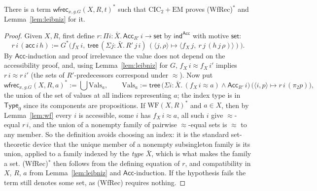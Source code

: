 \documentclass[10pt]{article}
\newcommand{\Type}{\mathsf{Type}}
\newcommand{\CIC}{\mathrm{CIC}}
\newcommand{\EM}{\mathrm{EM}}
\newcommand{\WF}{\mathrm{WF}}
\newcommand{\wfrec}{\mathsf{wfrec}}
\begin{document}
\begin{lemma}[$\wfrec$]\label{lem:wfrec}
There is a term $\wfrec_{x,g.G}(X,R,t)^*$ such that $\CIC_2+\EM$ proves
(WfRec)$^*$ and Lemma~\ref{lem:leibniz} for it.
\end{lemma}
\begin{proof}
Given $X,R$, first define
$r:\Pi i{:}\bar X.\,\mathsf{Acc}_{R'}\,i\to\mathsf{set}$ by
$\mathsf{ind}^{\mathsf{Acc}}$ with motive $\mathsf{set}$:
\[
r\,i\,(\mathsf{acc}\,i\,h):=G^*\bigl(f_X\,i,\ \mathsf{tree}\,(\Sigma j{:}\bar X.\,R'\,j\,i)\,(\langle j,\rho\rangle\mapsto\langle f_X\,j,\ r\,j\,(h\,j\,\rho)\rangle)\bigr).
\]
By $\mathsf{Acc}$-induction and proof irrelevance the value does not
depend on the accessibility proof, and, using Lemma~\ref{lem:leibniz}
for $G$, $f_X\,i\approx f_X\,i'$ implies $r\,i\approx r\,i'$ (the sets of
$R'$-predecessors correspond under $\approx$). Now put
\[
\wfrec_{x,g.G}(X,R,a)^*:=\textstyle\bigcup\mathrm{Vals}_a,\qquad
\mathrm{Vals}_a:=\mathsf{tree}\,\bigl(\Sigma i{:}\bar X.\,(f_X\,i\approx a)\wedge\mathsf{Acc}_{R'}\,i\bigr)\,\bigl(\langle i,p\rangle\mapsto r\,i\,(\pi_2 p)\bigr),
\]
the union of the set of values at all indices representing $a$; the index
type is in $\Type_0$ since its components are propositions. If
$\WF(X,R)^*$ and $a\in X$, then by
Lemma~\ref{lem:wf} every $i$ is accessible, some $i$ has $f_X\,i\approx a$,
all such $i$ give $\approx$-equal $r\,i$, and the union of a nonempty
family of pairwise $\approx$-equal sets is $\approx$ to any member. So
the definition avoids choosing an index: it is the standard set-theoretic
device that the unique member of a nonempty subsingleton family is its
union, applied to a family indexed by the \emph{type} $\bar X$, which is
what makes the family a set. (WfRec)$^*$ then follows from the defining
equation of $r$, and compatibility in $X$, $R$, $a$ from
Lemma~\ref{lem:leibniz} and $\mathsf{Acc}$-induction. If the hypothesis
fails the term still denotes some set, as (WfRec) requires nothing.
\end{proof}
\end{document}
